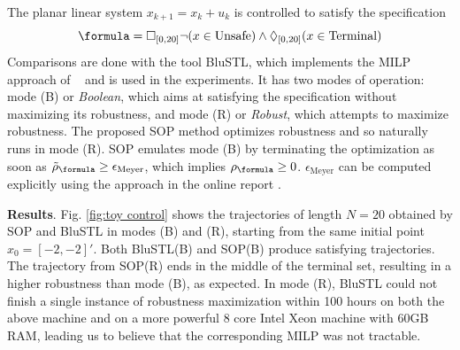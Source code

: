 \begin{exmp}
\label{ex:toyproblem}
The planar linear system $x_{k+1} = x_k + u_k$ is controlled
to satisfy the specification
\[\formula = \always_{[0,20]} \neg (x \in \text{Unsafe}) \land \eventually_{[0,20]} (x \in \text{Terminal})\]
Comparisons are done with the tool BluSTL, which implements the MILP approach of ~\cite{Raman14_MPCSTL} and is used in the experiments.
It has two modes of operation: mode (B) or \textit{Boolean}, which aims at satisfying the specification without maximizing its robustness, and mode (R) or \textit{Robust}, which attempts to maximize robustness. 
The proposed SOP method optimizes robustness and so naturally runs in mode (R).
SOP emulates mode (B) by terminating the optimization as soon as $\srobf \geq \epsilon_{\text{Meyer}}$, which implies $\rob_{\formula} \geq 0$. $\epsilon_{\text{Meyer}}$ can be computed explicitly using the approach in the online report \cite{PantAM17_SmoothOpTechRpt}.


\textbf{Results}.
Fig. \ref{fig:toy control} shows the trajectories of length $N=20$ obtained by SOP and BluSTL in modes (B) and (R), starting from the same initial point $x_0=[-2,-2]'$.
Both BluSTL(B) and SOP(B) produce satisfying trajectories. 
The trajectory from SOP(R) ends in the middle of the terminal set, resulting in a higher robustness than mode (B), as expected. 
In mode (R), BluSTL could not finish a single instance of robustness maximization within 100 hours on both the above machine and on a more powerful 8 core Intel Xeon machine with 60GB RAM, leading us to believe that the corresponding MILP was not tractable.
 

\end{exmp}
